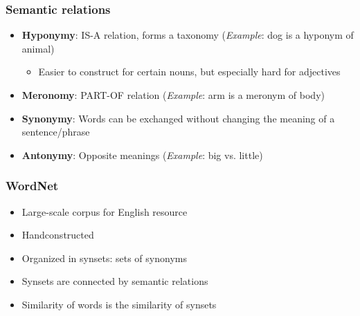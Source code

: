 \subsubsection{Semantic relations}
\begin{itemize}
	\item \textbf{Hyponymy}: IS-A relation, forms a taxonomy (\textit{Example}: dog is a hyponym of animal)
	\begin{itemize}
		\item Easier to construct for certain nouns, but especially hard for adjectives
	\end{itemize}
	\item \textbf{Meronomy}: PART-OF relation (\textit{Example}: arm is a meronym of body)
	\item \textbf{Synonymy}: Words can be exchanged without changing the meaning of a sentence/phrase
	\item \textbf{Antonymy}: Opposite meanings (\textit{Example}: big vs. little)
\end{itemize}
\subsubsection{WordNet}
\begin{itemize}
	\item Large-scale corpus for English resource
	\item Handconstructed
	\item Organized in synsets: sets of synonyms
	\item Synsets are connected by semantic relations
	\item Similarity of words is the similarity of synsets
\end{itemize}

